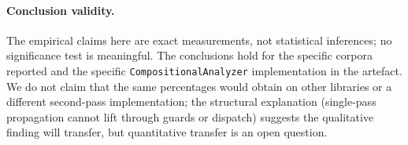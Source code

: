 \paragraph{Conclusion validity.}
The empirical claims here are exact measurements, not statistical
inferences; no significance test is meaningful. The conclusions hold
for the specific corpora reported and the specific
\texttt{CompositionalAnalyzer} implementation in the artefact. We do
not claim that the same percentages would obtain on other libraries
or a different second-pass implementation; the structural explanation
(single-pass propagation cannot lift through guards or dispatch)
suggests the qualitative finding will transfer, but quantitative
transfer is an open question.
